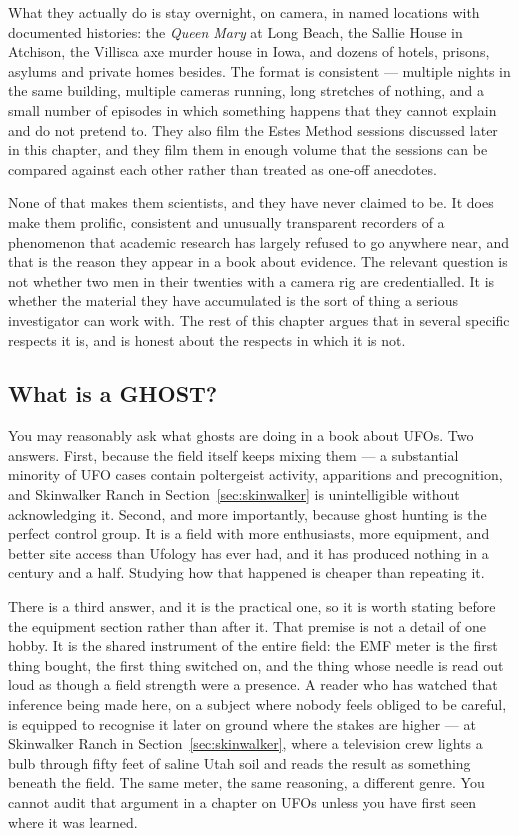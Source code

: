 What they actually do is stay overnight, on camera, in named locations with documented
histories: the \emph{Queen Mary} at Long Beach, the Sallie House in Atchison, the Villisca axe
murder house in Iowa, and dozens of hotels, prisons, asylums and private homes besides. The
format is consistent --- multiple nights in the same building, multiple cameras running,
long stretches of nothing, and a small number of episodes in which something happens that
they cannot explain and do not pretend to. They also film the Estes Method sessions discussed
later in this chapter, and they film them in enough volume that the sessions can be compared
against each other rather than treated as one-off anecdotes.

None of that makes them scientists, and they have never claimed to be. It does make them
prolific, consistent and unusually transparent recorders of a phenomenon that academic
research has largely refused to go anywhere near, and that is the reason they appear in a book
about evidence. The relevant question is not whether two men in their twenties with a camera
rig are credentialled. It is whether the material they have accumulated is the sort of thing a
serious investigator can work with. The rest of this chapter argues that in several specific
respects it is, and is honest about the respects in which it is not.

\subsection{What is a GHOST?}\label{sec:whatghost}
You may reasonably ask what ghosts are doing in a book about UFOs. Two answers. First,
because the field itself keeps mixing them --- a substantial minority of UFO cases contain
poltergeist activity, apparitions and precognition, and Skinwalker Ranch in
Section~\ref{sec:skinwalker} is unintelligible without acknowledging it. Second, and more
importantly, because ghost hunting is the perfect control group. It is a field with more
enthusiasts, more equipment, and better site access than Ufology has ever had, and it has
produced nothing in a century and a half. Studying how that happened is cheaper than repeating
it.

There is a third answer, and it is the practical one, so it is worth stating before the
equipment section rather than after it.  That premise is not a detail of one
hobby. It is the shared instrument of the entire field: the EMF meter is the first thing bought,
the first thing switched on, and the thing whose needle is read out loud as though a field
strength were a presence. A reader who has watched that inference being made here, on a subject
where nobody feels obliged to be careful, is equipped to recognise it later on ground where the
stakes are higher --- at Skinwalker Ranch in Section~\ref{sec:skinwalker}, where a television
crew lights a bulb through fifty feet of saline Utah soil and reads the result as something
beneath the field. The same meter, the same reasoning, a different genre. You cannot audit that
argument in a chapter on UFOs unless you have first seen where it was learned.

